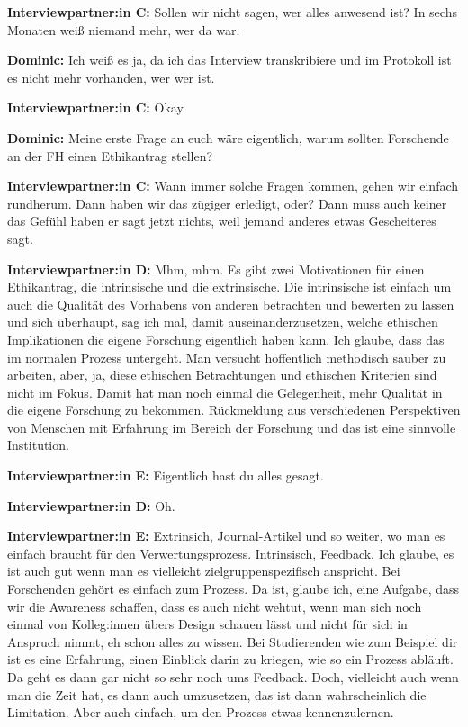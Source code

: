 \documentclass[a4paper,12pt,twoside,numbers=noendperiod]{scrreprt}
\begin{document}
\textbf{Interviewpartner:in C:} Sollen wir nicht sagen, wer alles anwesend ist? In sechs Monaten weiß niemand mehr, wer da war.

\textbf{Dominic:} Ich weiß es ja, da ich das Interview transkribiere und im Protokoll ist es nicht mehr vorhanden, wer wer ist.

\textbf{Interviewpartner:in C:} Okay.

\textbf{Dominic:} Meine erste Frage an euch wäre eigentlich, warum sollten Forschende an der FH einen Ethikantrag stellen?

\textbf{Interviewpartner:in C:} Wann immer solche Fragen kommen, gehen wir einfach rundherum. Dann haben wir das zügiger erledigt, oder? Dann muss auch keiner das Gefühl haben er sagt jetzt nichts, weil jemand anderes etwas Gescheiteres sagt.

\textbf{Interviewpartner:in D:} Mhm, mhm. Es gibt zwei Motivationen für einen Ethikantrag, die intrinsische und die extrinsische. Die intrinsische ist einfach um auch die Qualität des Vorhabens von anderen betrachten und bewerten zu lassen und sich überhaupt, sag ich mal, damit auseinanderzusetzen, welche ethischen Implikationen die eigene Forschung eigentlich haben kann. Ich glaube, dass das im normalen Prozess untergeht. Man versucht hoffentlich methodisch sauber zu arbeiten, aber, ja, diese ethischen Betrachtungen und ethischen Kriterien sind nicht im Fokus. Damit hat man noch einmal die Gelegenheit, mehr Qualität in die eigene Forschung zu bekommen. Rückmeldung aus verschiedenen Perspektiven von Menschen mit Erfahrung im Bereich der Forschung und das ist eine sinnvolle Institution.

\textbf{Interviewpartner:in E:} Eigentlich hast du alles gesagt.

\textbf{Interviewpartner:in D:} Oh.

\textbf{Interviewpartner:in E:} Extrinsich, Journal-Artikel und so weiter, wo man es einfach braucht für den Verwertungsprozess. Intrinsisch, Feedback. Ich glaube, es ist auch gut wenn man es vielleicht zielgruppenspezifisch anspricht. Bei Forschenden gehört es einfach zum Prozess. Da ist, glaube ich, eine Aufgabe, dass wir die Awareness schaffen, dass es auch nicht wehtut, wenn man sich noch einmal von Kolleg:innen übers Design schauen lässt und nicht für sich in Anspruch nimmt, eh schon alles zu wissen. Bei Studierenden wie zum Beispiel dir ist es eine Erfahrung, einen Einblick darin zu kriegen, wie so ein Prozess abläuft. Da geht es dann gar nicht so sehr noch ums Feedback. Doch, vielleicht auch wenn man die Zeit hat, es dann auch umzusetzen, das ist dann wahrscheinlich die Limitation. Aber auch einfach, um den Prozess etwas kennenzulernen.
\end{document}
